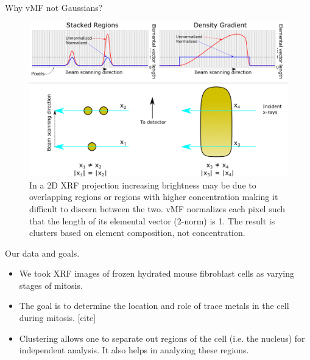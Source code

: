 \documentclass[
]{beamer}
\begin{document}
\begin{frame}{Why vMF not Gaussians?}
\begin{figure}[h]
  \includegraphics[width=1\textwidth,height=.5\textheight,keepaspectratio]{Normalization.png}
  \caption{In a 2D XRF projection increasing brightness may be due to overlapping regions or regions with higher concentration making it difficult to discern between the two. vMF normalizes each pixel such that the length of its elemental vector (2-norm) is 1. The result is clusters based on element composition, not concentration.}
\end{figure}
\end{frame}

\begin{frame}{Our data and goals.}
    \begin{itemize}
        \item We took XRF images of frozen hydrated mouse fibroblast cells as varying stages of mitosis.
        \item The goal is to determine the location and role of trace metals in the cell during mitosis. [cite]
        \item Clustering allows one to separate out regions of the cell (i.e. the nucleus) for independent analysis. It also helps in analyzing these regions.
    \end{itemize}
\end{frame}
\end{document}
